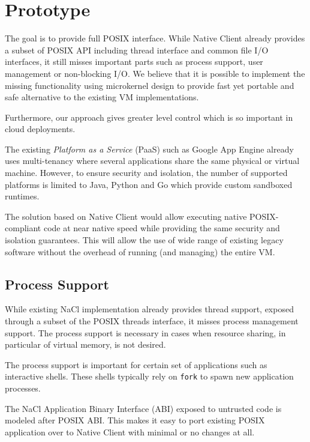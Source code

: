 \section{Prototype}
\label{sec:prototype}

The goal is to provide full POSIX interface. While Native Client already
provides a subset of POSIX API including thread interface and common
file I/O interfaces, it still misses important parts such as process
support, user management or non-blocking I/O. We believe that it is
possible to implement the missing functionality using microkernel design
to provide fast yet portable and safe alternative to the existing VM
implementations.

Furthermore, our approach gives greater level control which is so
important in cloud deployments.

The existing \emph{Platform as a Service} (PaaS) such as Google
App Engine already uses multi-tenancy where several applications share
the same physical or virtual machine. However, to ensure security and
isolation, the number of supported platforms is limited to Java, Python
and Go which provide custom sandboxed runtimes.

The solution based on Native Client would allow executing native
POSIX-compliant code at near native speed while providing the same
security and isolation guarantees. This will allow the use of wide
range of existing legacy software without the overhead of running (and
managing) the entire VM.

\subsection{Process Support}
\label{sub:process_support}

While existing NaCl implementation already provides thread support,
exposed through a subset of the POSIX threads interface, it misses
process management support. The process support is necessary in cases
when resource sharing, in particular of virtual memory, is not desired.

The process support is important for certain set of applications such
as interactive shells. These shells typically rely on \lstinline`fork` to
spawn new application processes. 


The NaCl Application Binary Interface (ABI) exposed to untrusted code is
modeled after POSIX ABI. This makes it easy to port existing POSIX
application over to Native Client with minimal or no changes at all.

